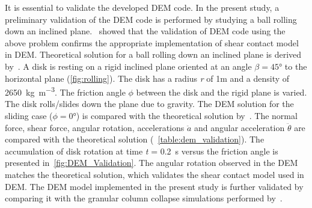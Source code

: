 It is essential to validate the developed DEM code. In the present study, a 
preliminary validation of the DEM code is performed by studying a ball rolling 
down an inclined plane.~\citet{O'Sullivan2003} showed that the validation of 
DEM code using the above problem confirms the appropriate implementation of 
shear contact model in DEM. Theoretical solution for a ball rolling down an 
inclined plane is derived by~\cite{Ke1995}. A disk is resting on a rigid 
inclined plane oriented at an angle $\beta = 45\si{\degree}$ to the horizontal 
plane (\cref{fig:rolling}). The disk has a radius \textit{r} of 1\si{m} and a 
density of 2650~\si{\kg\per\m\cubed}. The friction angle $\phi$ between the 
disk and the rigid plane is varied. The disk rolls/slides down the plane due to 
gravity. The DEM solution for the sliding case ($\phi=0\si{\degree}$) is 
compared with the theoretical solution by~\citet{Ke1995}. The normal force, 
shear force, angular rotation, accelerations $\ddot{a}$ and angular 
acceleration $\ddot{\theta}$ are compared with the theoretical solution 
(~\cref{table:dem_validation}). The accumulation of disk rotation at time 
\textit{t} = 0.2~\si{\s} versus the friction angle is presented 
in~\cref{fig:DEM_Validation}. The angular rotation observed in the DEM matches 
the theoretical solution, which validates the shear contact model used in DEM. 
The DEM model implemented in the present study is further validated by 
comparing it with the granular column collapse simulations performed 
by~\citet{Zenit2005}.  


